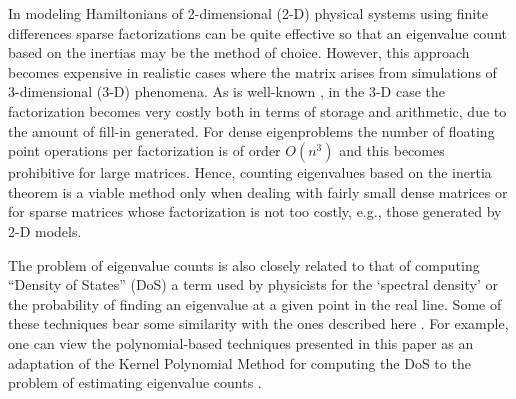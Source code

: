 \documentclass[12pt]{article}		\usepackage{tabls,multirow}
\begin{document}
In modeling Hamiltonians of 2-dimensional (2-D) physical systems using
finite differences sparse factorizations can be quite effective so
that an eigenvalue count based on the inertias may be the method of
choice. However, this approach becomes expensive in realistic cases
where the matrix arises from simulations of 3-dimensional (3-D)
phenomena. As is well-known \cite{George-Liu-book,TDavis-book}, in the
3-D case the factorization becomes very costly both in terms of
storage and arithmetic, due to the amount of fill-in generated.  For
dense eigenproblems the number of floating point operations per
factorization is of order $O(n^3)$ and this becomes prohibitive for
large matrices. Hence, counting eigenvalues based on the inertia
theorem is a viable method only when dealing with fairly small dense
matrices or for sparse matrices whose factorization is not too costly,
e.g., those generated by 2-D models.

The problem of eigenvalue counts is also closely related to that of
computing ``Density of States'' (DoS) a term used by physicists for
the `spectral density' or the probability of finding an eigenvalue at
a given point in the real line.  Some of these techniques bear some
similarity with the ones described here \cite{LinYangSaad13-TR}. For
example, one can view the polynomial-based techniques presented in
this paper as an adaptation of the Kernel Polynomial Method for
computing the DoS to the problem of estimating eigenvalue counts
\cite{SilverRoederAl,Wang-DOS,Roder-al-96,SilverRoder1994}.
\end{document}
